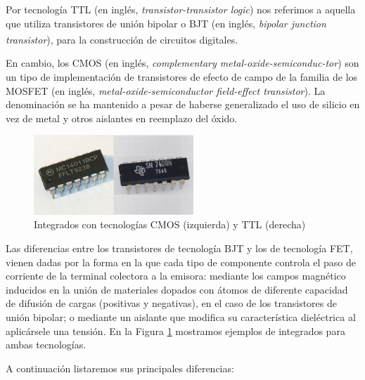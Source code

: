 \documentclass[a4paper]{article}
\let\originalcite\cite
\renewcommand{\cite}[2][]{\textsuperscript{\originalcite{#2}}}
\begin{document}
Por tecnología TTL (en inglés, \textit{transistor-transistor logic})
nos referimos a aquella que utiliza transistores de unión bipolar o 
BJT (en inglés, \textit{bipolar junction transistor}), para la 
construcción de circuitos digitales\cite{bib:boylestad}.

En cambio, los CMOS (en inglés, \textit{complementary 
metal-oxide-semiconduc-tor}) son un tipo de implementación de 
transistores de efecto de campo de la familia de los MOSFET (en 
inglés, \textit{metal-oxide-semiconductor field-effect transistor}). 
La denominación se ha mantenido a pesar de haberse generalizado el 
uso de silicio en vez de metal y otros aislantes en reemplazo del 
óxido.

\begin{figure}[h]\centering
    \includegraphics[height=3cm]{transistores.png}
    \caption{Integrados con tecnologías CMOS (izquierda) y TTL 
    (derecha)}\label{fig:transistores}
\end{figure}

Las diferencias entre los transistores de tecnología BJT y los de 
tecnología FET, vienen dadas por la forma en la que cada tipo de 
componente controla el paso de corriente de la terminal colectora a 
la emisora: mediante los campos magnético inducidos en la unión de 
materiales dopados con átomos de diferente capacidad de difusión
de cargas (positivas y negativas), en el caso de los transistores de
unión bipolar; o mediante un aislante que modifica su característica
dieléctrica al aplicársele una tensión. En la Figura 
\ref{fig:transistores} mostramos ejemplos de integrados para ambas 
tecnologías.

A continuación listaremos sus principales diferencias:
\end{document}
